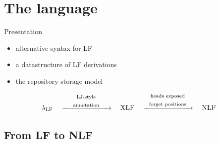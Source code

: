 \documentclass[ignorenonframetext,red]{beamer}
\begin{document}
\section{The language}

\begin{frame}{Presentation}
  \begin{itemize}
  \item alternative syntax for LF
  \item a datastructure of LF derivations
  \item the repository storage model
  \end{itemize}
  \vspace{2em}
  \large
  \[
  \lambda_{\text{LF}}
  \quad\xrightarrow{\text{
      \begin{minipage}{20ex}
        \begin{center}
          LJ-style\\
          annotation
        \end{center}
      \end{minipage}
    }}\quad
  \text{XLF}
  \quad\xrightarrow{\text{
      \begin{minipage}{20ex}
        \begin{center}
          heads exposed\\
          forget positions
        \end{center}
      \end{minipage}
    }}\quad
  \text{NLF}
  \]
\end{frame}

\subsection{From LF to NLF}
\end{document}

